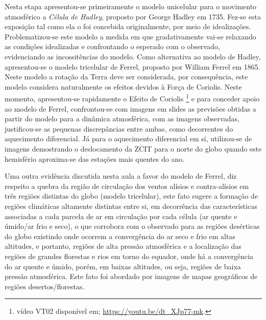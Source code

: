 Nesta etapa apresentou-se primeiramente o modelo unicelular para o movimento atmosférico a \textit{Célula de Hadley}, proposto por George Hadley em 1735. Fez-se esta exposição tal como ela o foi concebida originalmente, por meio de idealizações. Problematizou-se este modelo a medida em que gradativamente vai-se relaxando as condições idealizadas e confrontando o esperado com o observado, evidenciando as incossitências do modelo. Como alternativa ao modelo de Hadley, apresentou-se o modelo tricelular de Ferrel, proposto por William Ferrel em 1865. Neste modelo a rotação da Terra deve ser considerada, por consequência, este modelo considera naturalmente os efeitos devidos à Força de Coriolis. Neste momento, apresentou-se rapidamente o Efeito de Coriolis \footnote{vídeo VT02 disponível em; \url{https://youtu.be/dt_XJp77-mk}.} e para conceder apoio ao modelo de Ferrel, confrontou-se com imagens em slides as previsões obtidas a partir do modelo para a dinâmica atmosférica, com as imagens observadas, justificou-se as pequenas discrepâncias entre ambas, como decorrentes do aquecimento diferencial. Já para o aquecimento diferencial em si, utilizou-se de imagens demostrando o deslocamento da \ac{ZCIT} para o norte do globo quando este hemisfério aproxima-se das estações mais quentes do ano.

Uma outra evidência discutida nesta aula a favor do modelo de Ferrel, diz respeito a quebra da região de circulação dos ventos alísios e contra-alísios em três regiões distintas do globo (modelo tricelular), este fato sugere a formação de regiões climáticas altamente distintas entre si, em decorrência das características associadas a cada parcela de ar em circulação por cada célula (ar quente e úmido/ar frio e seco), o que corrobora com o observado para as regiões desérticas do globo existindo onde ocorrem a convergência do ar seco e frio em altas altitudes, e portanto, regiões de alta pressão atmosférica e a localização das regiões de grandes florestas e rios em torno do equador, onde há a convergência do ar quente e úmido, porém, em baixas altitudes, ou seja, regiões de baixa pressão atmosférica. Este fato foi abordado por imagens de mapas geográficos de regiões desertos/florestas. 


